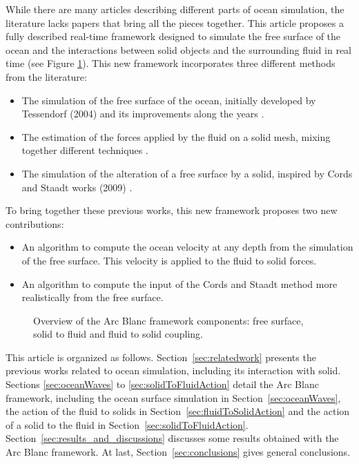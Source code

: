 \documentclass[final]{jcgt}
\def\framework{the Arc Blanc framework\xspace}
\begin{document}
While there are many articles describing different parts of ocean simulation, the literature lacks papers that bring all the pieces together.
This article proposes a fully described real-time framework designed to simulate the free surface of the ocean and the interactions between solid objects and the surrounding fluid in real time (see Figure \ref{fig:overviewFramework}).
This new framework incorporates three different methods from the literature:
\begin{itemize}
	\item The simulation of the free surface of the ocean, initially developed by Tessendorf (2004) \cite{tessendorfSimulatingOceanWater1999} and its improvements along the years \cite{horvathEmpiricalDirectionalWave2015,tessendorfGilliganPrototypeFramework2017}.
	\item The estimation of the forces applied by the fluid on a solid mesh, mixing together different techniques \cite{yukselRealtimeWaterWaves2010,kellomakiRigidBodyInteraction2014}.
	\item The simulation of the alteration of a free surface by a solid, inspired by Cords and Staadt works (2009) \cite{cordsRealTimeOpenWater2009}.
\end{itemize}
To bring together these previous works, this new framework proposes two new contributions:
\begin{itemize}
	\item An algorithm to compute the ocean velocity at any depth from the simulation of the free surface. This velocity is applied to the fluid to solid forces.
	\item An algorithm to compute the input of the Cords and Staadt method more realistically from the free surface.
\end{itemize}



\begin{figure}
	\centering
	
	\caption{Overview of \framework components: free surface, solid to fluid and fluid to solid coupling.}
	\label{fig:overviewFramework}
\end{figure}

This article is organized as follows.
Section~\ref{sec:relatedwork} presents the previous works related to ocean simulation, including its interaction with solid.
Sections \ref{sec:oceanWaves} to \ref{sec:solidToFluidAction} detail \framework, including the ocean surface simulation in Section~\ref{sec:oceanWaves}, the action of the fluid to solids in Section~\ref{sec:fluidToSolidAction} and the action of a solid to the fluid in Section~\ref{sec:solidToFluidAction}.
Section~\ref{sec:results_and_discussions} discusses some results obtained with \framework.
At last, Section~\ref{sec:conclusions} gives general conclusions.
\end{document}
